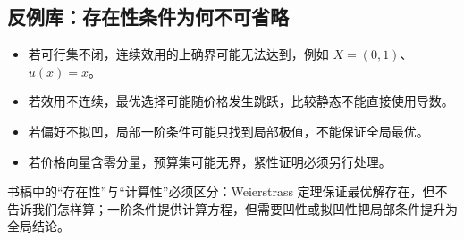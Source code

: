 \subsection{反例库：存在性条件为何不可省略}
\begin{itemize}
\item 若可行集不闭，连续效用的上确界可能无法达到，例如 $X=(0,1)$、$u(x)=x$。
\item 若效用不连续，最优选择可能随价格发生跳跃，比较静态不能直接使用导数。
\item 若偏好不拟凹，局部一阶条件可能只找到局部极值，不能保证全局最优。
\item 若价格向量含零分量，预算集可能无界，紧性证明必须另行处理。
\end{itemize}

\begin{remark}
书稿中的“存在性”与“计算性”必须区分：Weierstrass 定理保证最优解存在，但不告诉我们怎样算；一阶条件提供计算方程，但需要凹性或拟凹性把局部条件提升为全局结论。
\end{remark}
